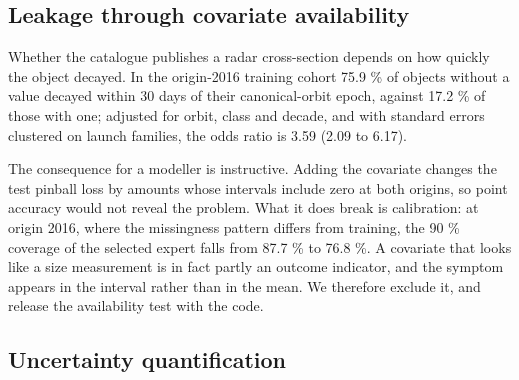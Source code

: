 \documentclass[3p,times]{elsarticle}
\begin{document}
\subsection{Leakage through covariate
availability}\label{leakage-through-covariate-availability}

Whether the catalogue publishes a radar cross-section depends on how
quickly the object decayed. In the origin-2016 training cohort 75.9 \%
of objects without a value decayed within 30 days of their
canonical-orbit epoch, against 17.2 \% of those with one; adjusted for
orbit, class and decade, and with standard errors clustered on launch
families, the odds ratio is 3.59 (2.09 to 6.17).

The consequence for a modeller is instructive. Adding the covariate
changes the test pinball loss by amounts whose intervals include zero at
both origins, so point accuracy would not reveal the problem. What it
does break is calibration: at origin 2016, where the missingness pattern
differs from training, the 90 \% coverage of the selected expert falls
from 87.7 \% to 76.8 \%. A covariate that looks like a size measurement
is in fact partly an outcome indicator, and the symptom appears in the
interval rather than in the mean. We therefore exclude it, and release
the availability test with the code.

\subsection{Uncertainty
quantification}\label{uncertainty-quantification}
\end{document}
